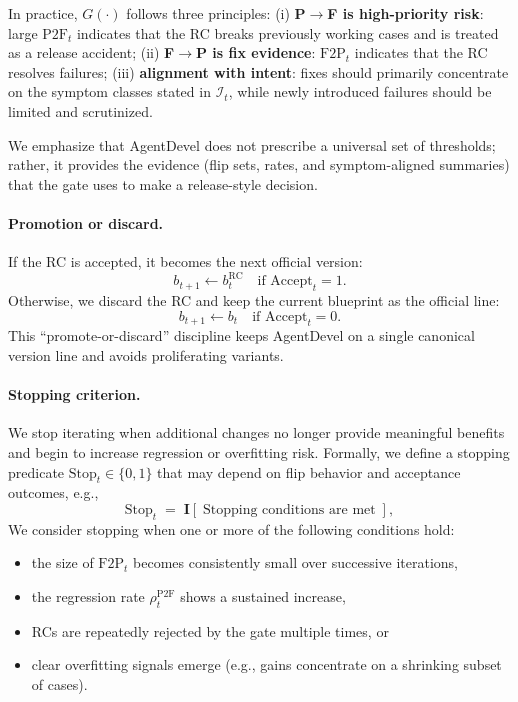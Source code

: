 \documentclass[11pt]{article}
\begin{document}
In practice, $G(\cdot)$ follows three principles:
(i) \textbf{P$\rightarrow$F is high-priority risk}: large $\mathrm{P2F}_t$ indicates that the RC breaks previously working cases and is treated as a release accident;
(ii) \textbf{F$\rightarrow$P is fix evidence}: $\mathrm{F2P}_t$ indicates that the RC resolves failures;
(iii) \textbf{alignment with intent}: fixes should primarily concentrate on the symptom classes stated in $\mathcal{I}_t$, while newly introduced failures should be limited and scrutinized.

We emphasize that AgentDevel does not prescribe a universal set of thresholds; rather, it provides the evidence (flip sets, rates, and symptom-aligned summaries) that the gate uses to make a release-style decision.

\paragraph{Promotion or discard.}
If the RC is accepted, it becomes the next official version:
\begin{equation}
b_{t+1} \leftarrow b_t^{\mathrm{RC}} \quad \text{if } \mathrm{Accept}_t=1.
\end{equation}
Otherwise, we discard the RC and keep the current blueprint as the official line:
\begin{equation}
b_{t+1} \leftarrow b_t \quad \text{if } \mathrm{Accept}_t=0.
\end{equation}
This ``promote-or-discard'' discipline keeps AgentDevel on a single canonical version line and avoids proliferating variants.

\paragraph{Stopping criterion.}
We stop iterating when additional changes no longer provide meaningful benefits and begin to increase regression or overfitting risk. Formally, we define a stopping predicate $\mathrm{Stop}_t\in\{0,1\}$ that may depend on flip behavior and acceptance outcomes, e.g.,
\begin{equation}
\mathrm{Stop}_t \;=\; \mathbf{I}\!\left[\;\text{Stopping conditions are met}\;\right],
\label{eq:stop}
\end{equation}
We consider stopping when one or more of the following conditions hold:
\begin{itemize}
    \item the size of $\mathrm{F2P}_t$ becomes consistently small over successive iterations,
    \item the regression rate $\rho_t^{\mathrm{P2F}}$ shows a sustained increase,
    \item RCs are repeatedly rejected by the gate multiple times, or
    \item clear overfitting signals emerge (e.g., gains concentrate on a shrinking subset of cases).
\end{itemize}
\end{document}
